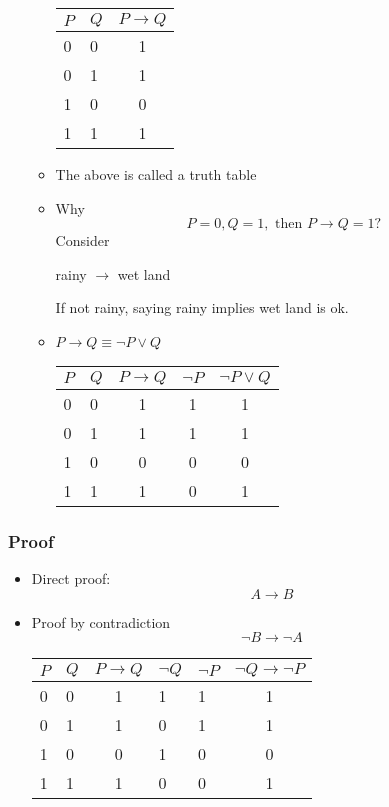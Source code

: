 \begin{frame}[allowframebreaks]
\begin{itemize}
\begin{itemize}
    \begin{center}
      \begin{tabular}{ll|c}
        $P$ & $Q$ & $P \rightarrow Q$ \\ \hline
        0& 0 & 1\\ 
        0& 1 & 1\\
        1& 0 & 0\\
        1& 1 & 1
      \end{tabular}
    \end{center}
  \item [] The above is called a truth table
  \item Why
    \begin{equation*}
      P = 0, Q = 1, \text{ then } P \rightarrow Q = 1?
    \end{equation*}
Consider
\begin{center}
rainy $\rightarrow$ wet land
\end{center}
If not rainy, 
saying rainy implies wet land is ok.
\item $P \rightarrow Q \equiv 
\neg P \vee Q$
    \begin{center}
      \begin{tabular}{ll|c|cc}
        $P$ & $Q$ & $P \rightarrow Q$ & $\neg P$ & $\neg P \vee Q$\\ \hline
        0& 0 & 1 & 1 & 1\\ 
        0& 1 & 1 & 1 & 1\\
        1& 0 & 0 & 0 & 0\\
        1& 1 & 1 & 0 & 1
      \end{tabular}
    \end{center}
  \end{itemize}

\end{itemize}\end{frame} \begin{frame}[allowframebreaks] \frametitle{Proof}
  \begin{itemize}  
  \item Direct proof:
    $$A\rightarrow B$$
  \item Proof by contradiction
    $$\neg B \rightarrow \neg A$$

    \begin{center}
      \begin{tabular}{ll|c|llc}
        $P$ & $Q$ & $P \rightarrow Q$ & $\neg Q$ & $\neg P$ & $\neg Q \rightarrow \neg P$\\ \hline
        0& 0 & 1 & 1 & 1 & 1\\ 
        0& 1 & 1 & 0 & 1 & 1\\
        1& 0 & 0 & 1 & 0 & 0\\
        1& 1 & 1 & 0 & 0 & 1
      \end{tabular}
    \end{center}
    

\end{itemize}
\end{frame}
